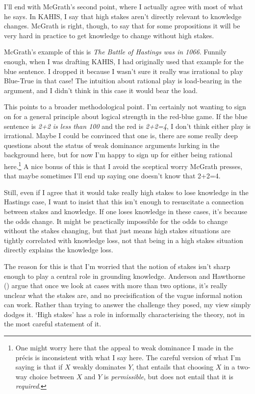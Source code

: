 \documentclass[
  11pt,
  letterpaper,
  DIV=11,
  numbers=noendperiod,
  twoside]{scrartcl}
\begin{document}
I'll end with McGrath's second point, where I actually agree with most
of what he says. In KAHIS, I say that high stakes aren't directly
relevant to knowledge changes. McGrath is right, though, to say that for
some propositions it will be very hard in practice to get knowledge to
change without high stakes.

McGrath's example of this is \emph{The Battle of Hastings was in 1066}.
Funnily enough, when I was drafting KAHIS, I had originally used that
example for the blue sentence. I dropped it because I wasn't sure it
really was irrational to play Blue-True in that case! The intuition
about rational play is load-bearing in the argument, and I didn't think
in this case it would bear the load.

This points to a broader methodological point. I'm certainly not wanting
to sign on for a general principle about logical strength in the
red-blue game. If the blue sentence is \emph{2+2 is less than 100} and
the red is \emph{2+2=4}, I don't think either play is irrational. Maybe
I could be convinced that one is, there are some really deep questions
about the status of weak dominance arguments lurking in the background
here, but for now I'm happy to sign up for either being rational
here.\footnote{One might worry here that the appeal to weak dominance I
  made in the précis is inconsistent with what I say here. The careful
  version of what I'm saying is that if \(X\) weakly dominates \(Y\),
  that entails that choosing \(X\) in a two-way choice between \(X\) and
  \(Y\) is \emph{permissible}, but does not entail that it is
  \emph{required}.} A nice bonus of this is that I avoid the sceptical
worry McGrath presses, that maybe sometimes I'll end up saying one
doesn't know that 2+2=4.

Still, even if I agree that it would take really high stakes to lose
knowledge in the Hastings case, I want to insist that this isn't enough
to resuscitate a connection between stakes and knowledge. If one loses
knowledge in these cases, it's because the odds change. It might be
practically impossible for the odds to change without the stakes
changing, but that just means high stakes situations are tightly
correlated with knowledge loss, not that being in a high stakes
situation directly explains the knowledge loss.

The reason for this is that I'm worried that the notion of stakes isn't
sharp enough to play a central role in grounding knowledge. Anderson and
Hawthorne () argue that once
we look at cases with more than two options, it's really unclear what
the stakes are, and no precisification of the vague informal notion can
work. Rather than trying to answer the challenge they posed, my view
simply dodges it. `High stakes' has a role in informally characterising
the theory, not in the most careful statement of it.
\end{document}
